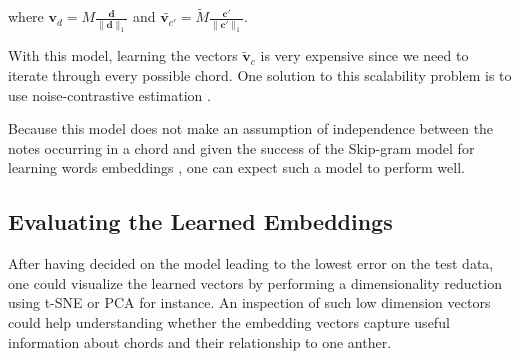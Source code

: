 \documentclass[12pt]{article}\pagestyle{myheadings}
\newcommand{\M}{\tilde{M}}
\newcommand{\boldc}{\boldsymbol c}
\newcommand{\boldd}{\boldsymbol d}
\newcommand{\boldvd}{\boldsymbol v_d}
\newcommand{\boldvc}{\boldsymbol v_{c'}}
\begin{document}
where $\boldvd = M\frac{ \boldd}{\| \boldd \|_1}$ and $ \tilde{\boldvc} = \M \frac{ \boldc'}{\| \boldc' \|_1}$.


With this model, learning the vectors $\tilde{\boldsymbol v}_c$ is very expensive since we need to iterate through every possible chord. One solution to this scalability problem is to use noise-contrastive estimation \citep{NIPS2013_5165}.  

Because this model does not make an assumption of independence between the notes occurring in a chord and given the success of the Skip-gram model for learning words embeddings \citep{mik2013}, one can expect such a model to perform well.


\subsection*{Evaluating the Learned Embeddings}
After having decided on the model leading to the lowest error on the test data, one could visualize the learned vectors by performing a dimensionality reduction using t-SNE or PCA for instance. An inspection of such low dimension vectors could help understanding whether the embedding vectors capture useful information about chords and their relationship to one anther. 


 
\end{document}
